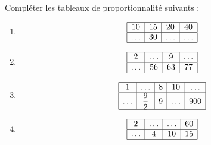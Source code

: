 
\begin{exercice}\label{exosmath-0945}

    Compléter les tableaux de proportionnalité suivants :
    \begin{multicols}{2}
    \begin{enumerate}
        \item
            \begin{equation*}
                \begin{array}[]{|c|c|c|c|}
                    \hline
                    10&15&20&40\\
                    \hline
                    \ldots&30&\ldots&\ldots\\
                    \hline
                \end{array}
            \end{equation*}
        \item
            \begin{equation*}
                \begin{array}[]{|c|c|c|c|}
                    \hline
                     2&\ldots&9&\ldots\\
                      \hline
                      \ldots&56&63&77\\ 
                      \hline 
                       \end{array}
                   \end{equation*}
               \item
                   \begin{equation*}
                       \begin{array}[]{|c|c|c|c|c|}
                           \hline
                           1&\ldots&8&10&\ldots\\
                           \hline
                           \ldots&\dfrac{ 9 }{2}&9&\ldots&900\\
                           \hline
                       \end{array}
                   \end{equation*}
                   \item
                       \begin{equation*}
                           \begin{array}[]{|c|c|c|c|}
                               \hline
                                2&\ldots&\ldots&60\\
                                 \hline
                                 \ldots&4&10&15\\ 
                                 \hline 
                                  \end{array}
                              \end{equation*}
    \end{enumerate}
    \end{multicols}

\end{exercice}
